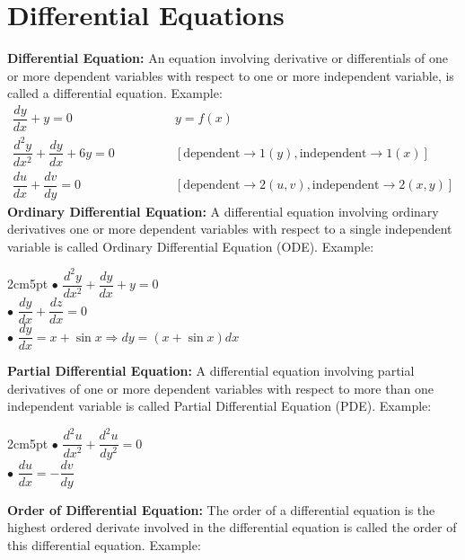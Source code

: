 \documentclass[a4aper,12pt]{report}
\begin{document}
\chapter{Differential Equations}
\vspace*{-30pt}
\textbf{Differential Equation: }An equation involving derivative or differentials of one or more dependent variables with respect to one or more independent variable, is called a differential equation. Example: 
\begin{align*}
    \dfrac{dy}{dx} + y = 0\qquad\qquad & y = f(x) \\ 
    \dfrac{d^2y}{dx^2}+\dfrac{dy}{dx}+6y=0 \qquad\qquad& [\text{dependent}\rightarrow 1(y),\text{independent} \rightarrow 1(x) ] \\ 
    \dfrac{du}{dx} +\dfrac{dv}{dy} = 0 \qquad\qquad & [\text{dependent} \rightarrow 2(u,v), \text{independent} \rightarrow 2(x,y)]
\end{align*}
\textbf{Ordinary Differential Equation: } A differential equation involving ordinary derivatives one or more dependent variables with respect to a single independent variable is called Ordinary Differential Equation (ODE). Example: \\ 
   \begin{adjustwidth}{2cm}{5pt}
        $\bullet\,\,\dfrac{d^2y}{dx^2} + \dfrac{dy}{dx} + y = 0$ \\ [5pt]
        $\bullet\,\,\dfrac{dy}{dx}+\dfrac{dz}{dx} = 0$ \\ [5pt]
        $\bullet\,\,\dfrac{dy}{dx} = x+\sin x \Rightarrow dy = (x+\sin x)dx$
    \end{adjustwidth}
    \vspace*{10pt}
    \textbf{Partial Differential Equation: } A differential equation involving partial derivatives of one or more dependent variables with respect to more than one independent variable is called Partial Differential Equation (PDE). Example:
    \vspace*{5pt}  
    \begin{adjustwidth}{2cm}{5pt}
        $\bullet \, \, \dfrac{d^2u}{dx^2} + \dfrac{d^2u}{dy^2}= 0$ \\ [5pt]
        $\bullet \,\,\dfrac{du}{dx}=-\dfrac{dv}{dy}$ 
    \end{adjustwidth}
    \vspace*{10pt}
    \textbf{Order of Differential Equation: }The order of a differential equation is the highest ordered derivate involved in the differential equation is called the order of this differential equation. Example: 
\end{document}
